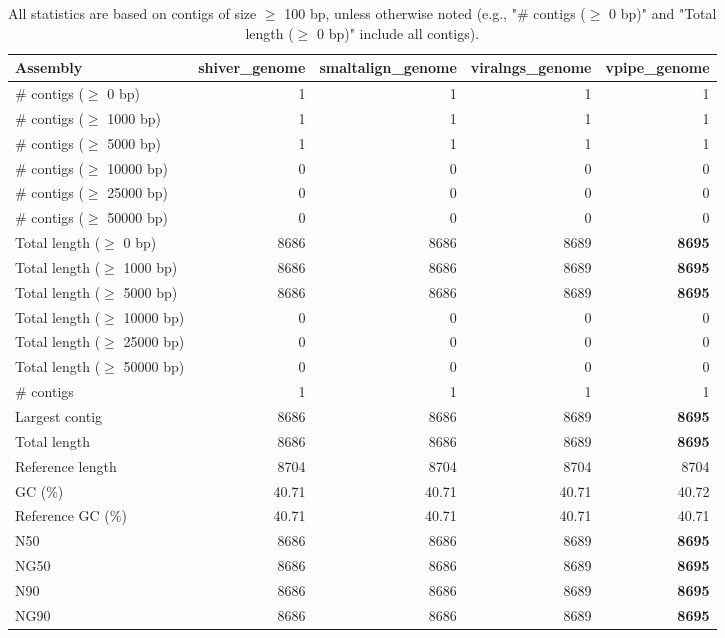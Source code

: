 \documentclass[12pt,a4paper]{article}
\begin{document}
\begin{table}[ht]
\begin{center}
\caption{All statistics are based on contigs of size $\geq$ 100 bp, unless otherwise noted (e.g., "\# contigs ($\geq$ 0 bp)" and "Total length ($\geq$ 0 bp)" include all contigs).}
\begin{tabular}{|l*{4}{|r}|}
\hline
Assembly & shiver\_genome & smaltalign\_genome & viralngs\_genome & vpipe\_genome \\ \hline
\# contigs ($\geq$ 0 bp) & 1 & 1 & 1 & 1 \\ \hline
\# contigs ($\geq$ 1000 bp) & 1 & 1 & 1 & 1 \\ \hline
\# contigs ($\geq$ 5000 bp) & 1 & 1 & 1 & 1 \\ \hline
\# contigs ($\geq$ 10000 bp) & 0 & 0 & 0 & 0 \\ \hline
\# contigs ($\geq$ 25000 bp) & 0 & 0 & 0 & 0 \\ \hline
\# contigs ($\geq$ 50000 bp) & 0 & 0 & 0 & 0 \\ \hline
Total length ($\geq$ 0 bp) & 8686 & 8686 & 8689 & {\bf 8695} \\ \hline
Total length ($\geq$ 1000 bp) & 8686 & 8686 & 8689 & {\bf 8695} \\ \hline
Total length ($\geq$ 5000 bp) & 8686 & 8686 & 8689 & {\bf 8695} \\ \hline
Total length ($\geq$ 10000 bp) & 0 & 0 & 0 & 0 \\ \hline
Total length ($\geq$ 25000 bp) & 0 & 0 & 0 & 0 \\ \hline
Total length ($\geq$ 50000 bp) & 0 & 0 & 0 & 0 \\ \hline
\# contigs & 1 & 1 & 1 & 1 \\ \hline
Largest contig & 8686 & 8686 & 8689 & {\bf 8695} \\ \hline
Total length & 8686 & 8686 & 8689 & {\bf 8695} \\ \hline
Reference length & 8704 & 8704 & 8704 & 8704 \\ \hline
GC (\%) & 40.71 & 40.71 & 40.71 & 40.72 \\ \hline
Reference GC (\%) & 40.71 & 40.71 & 40.71 & 40.71 \\ \hline
N50 & 8686 & 8686 & 8689 & {\bf 8695} \\ \hline
NG50 & 8686 & 8686 & 8689 & {\bf 8695} \\ \hline
N90 & 8686 & 8686 & 8689 & {\bf 8695} \\ \hline
NG90 & 8686 & 8686 & 8689 & {\bf 8695} \\ \hline

\end{tabular}
\end{center}
\end{table}
\end{document}

